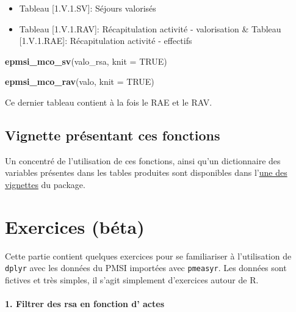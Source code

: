 \documentclass[]{book}
\newenvironment{Shaded}{\begin{snugshade}}{\end{snugshade}}
\newcommand{\DataTypeTok}[1]{\textcolor[rgb]{0.13,0.29,0.53}{#1}}
\newcommand{\KeywordTok}[1]{\textcolor[rgb]{0.13,0.29,0.53}{\textbf{#1}}}
\newcommand{\NormalTok}[1]{#1}
\newcommand{\OtherTok}[1]{\textcolor[rgb]{0.56,0.35,0.01}{#1}}
\providecommand{\tightlist}{%
  \setlength{\itemsep}{0pt}\setlength{\parskip}{0pt}}
\begin{document}
\begin{itemize}
\tightlist
\item
  Tableau {[}1.V.1.SV{]}: Séjours valorisés
\item
  Tableau {[}1.V.1.RAV{]}: Récapitulation activité - valorisation \& Tableau {[}1.V.1.RAE{]}: Récapitulation activité - effectifs
\end{itemize}

\begin{Shaded}
\begin{Highlighting}[]
\KeywordTok{epmsi_mco_sv}\NormalTok{(valo_rsa, }\DataTypeTok{knit =} \OtherTok{TRUE}\NormalTok{)}
\end{Highlighting}
\end{Shaded}

\begin{Shaded}
\begin{Highlighting}[]
\KeywordTok{epmsi_mco_rav}\NormalTok{(valo, }\DataTypeTok{knit =} \OtherTok{TRUE}\NormalTok{)}
\end{Highlighting}
\end{Shaded}

Ce dernier tableau contient à la fois le RAE et le RAV.

\hypertarget{vignette-presentant-ces-fonctions}{%
\section{Vignette présentant ces fonctions}\label{vignette-presentant-ces-fonctions}}

Un concentré de l'utilisation de ces fonctions, ainsi qu'un dictionnaire des variables présentes dans les tables produites sont disponibles dans l'\href{https://im-aphp.github.io/pmeasyr/articles/vignette4.html}{une des vignettes} du package.

\hypertarget{exercices-beta}{%
\chapter{Exercices (béta)}\label{exercices-beta}}

Cette partie contient quelques exercices pour se familiariser à l'utilisation de \texttt{dplyr} avec les données du PMSI importées avec \texttt{pmeasyr}. Les données sont fictives et très simples, il s'agit simplement d'exercices autour de R.

\hypertarget{filtrer-des-rsa-en-fonction-d-actes}{%
\subsubsection{1. Filtrer des rsa en fonction d' actes}\label{filtrer-des-rsa-en-fonction-d-actes}}
\end{document}
